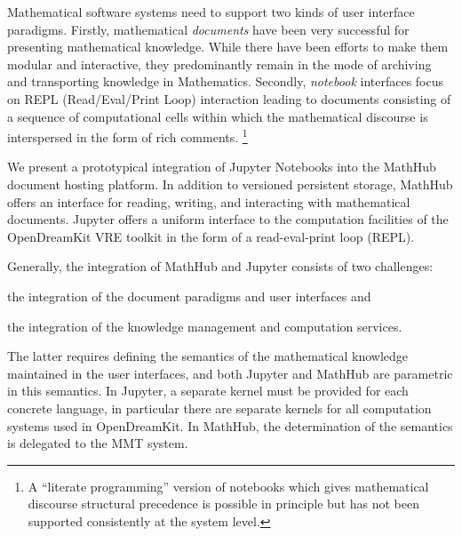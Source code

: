 Mathematical software systems need to support two kinds of user interface paradigms.
Firstly, mathematical \emph{documents} have been very successful for presenting mathematical knowledge.
While there have been efforts to make them modular and interactive, they predominantly remain in the mode of archiving and transporting knowledge in Mathematics.
Secondly, \emph{notebook} interfaces focus on REPL (Read/Eval/Print Loop) interaction leading to documents consisting of a sequence of computational cells within which the mathematical discourse is interspersed in the form of rich comments.
\footnote {A ``literate programming'' version of notebooks which gives mathematical discourse structural precedence is possible in principle but has not been supported consistently at the system level.}

We present a prototypical integration of Jupyter Notebooks into the MathHub document hosting platform.
In addition to versioned persistent storage, MathHub offers an interface for reading, writing, and interacting with mathematical documents.
Jupyter offers a uniform interface to the computation facilities of the OpenDreamKit VRE toolkit in the form of a read-eval-print loop (REPL).

Generally, the integration of MathHub and Jupyter consists of two challenges:
\begin{inparaenum}[\em a\rm )]
\item the integration of the document paradigms and user interfaces and
\item the integration of the knowledge management and computation services.
\end{inparaenum}
The latter requires defining the semantics of the mathematical knowledge maintained in the user interfaces, and both Jupyter and MathHub are parametric in this semantics.
In Jupyter, a separate kernel must be provided for each concrete language, in particular there are separate kernels for all computation systems used in OpenDreamKit.
In MathHub, the determination of the semantics is delegated to the MMT system.


